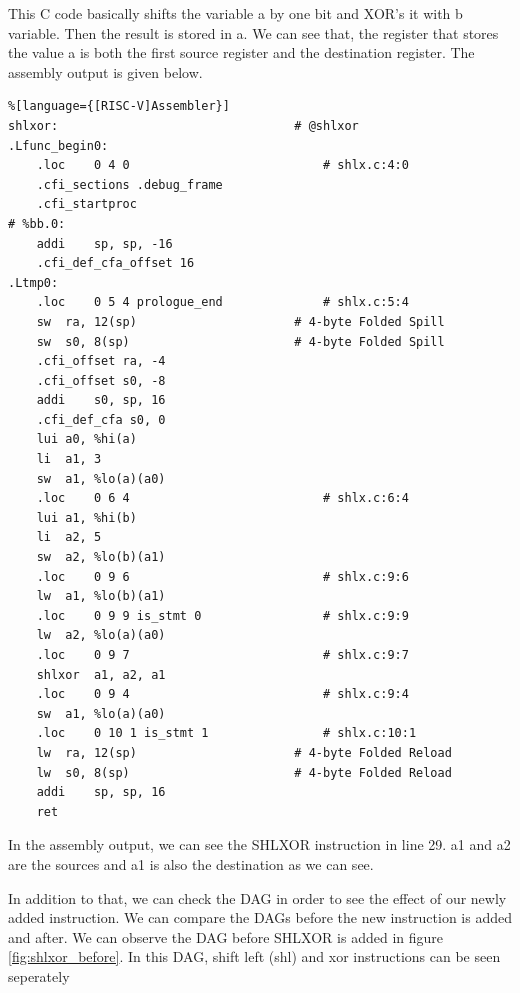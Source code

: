 This C code basically shifts the variable a by one bit and XOR’s it with b variable. Then the result is stored in a. We can see that, the register that stores the value a is both the first source register and the destination register. The assembly output is given below.
\begin{lstlisting}%[language={[RISC-V]Assembler}]
shlxor:                                 # @shlxor
.Lfunc_begin0:
	.loc	0 4 0                           # shlx.c:4:0
	.cfi_sections .debug_frame
	.cfi_startproc
# %bb.0:
	addi	sp, sp, -16
	.cfi_def_cfa_offset 16
.Ltmp0:
	.loc	0 5 4 prologue_end              # shlx.c:5:4
	sw	ra, 12(sp)                      # 4-byte Folded Spill
	sw	s0, 8(sp)                       # 4-byte Folded Spill
	.cfi_offset ra, -4
	.cfi_offset s0, -8
	addi	s0, sp, 16
	.cfi_def_cfa s0, 0
	lui	a0, %hi(a)
	li	a1, 3
	sw	a1, %lo(a)(a0)
	.loc	0 6 4                           # shlx.c:6:4
	lui	a1, %hi(b)
	li	a2, 5
	sw	a2, %lo(b)(a1)
	.loc	0 9 6                           # shlx.c:9:6
	lw	a1, %lo(b)(a1)
	.loc	0 9 9 is_stmt 0                 # shlx.c:9:9
	lw	a2, %lo(a)(a0)
	.loc	0 9 7                           # shlx.c:9:7
	shlxor	a1, a2, a1
	.loc	0 9 4                           # shlx.c:9:4
	sw	a1, %lo(a)(a0)
	.loc	0 10 1 is_stmt 1                # shlx.c:10:1
	lw	ra, 12(sp)                      # 4-byte Folded Reload
	lw	s0, 8(sp)                       # 4-byte Folded Reload
	addi	sp, sp, 16
	ret
\end{lstlisting}

In the assembly output, we can see the SHLXOR instruction in line 29. a1 and a2 are the sources and a1 is also the destination as we can see.

In addition to that, we can check the DAG in order to see the effect of our newly added instruction. We can compare the DAGs before the new instruction is added and after. We can observe the DAG before SHLXOR is added in figure \ref{fig:shlxor_before}. In this DAG, shift left (shl) and xor instructions can be seen seperately

